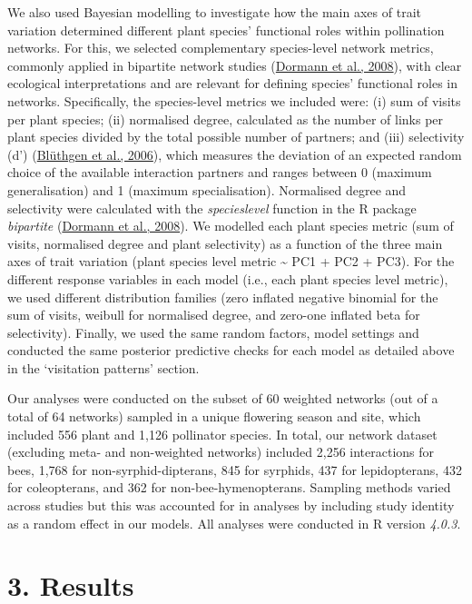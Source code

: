 \documentclass[
  12pt,
  a4paper,
]{article}
\begin{document}
We also used Bayesian modelling to investigate how the main axes of trait variation determined different plant species' functional roles within pollination networks. For this, we selected complementary species-level network metrics, commonly applied in bipartite network studies (\protect\hyperlink{ref-dormann2008}{Dormann et al., 2008}), with clear ecological interpretations and are relevant for defining species' functional roles in networks. Specifically, the species-level metrics we included were: (i) sum of visits per plant species; (ii) normalised degree, calculated as the number of links per plant species divided by the total possible number of partners; and (iii) selectivity (d') (\protect\hyperlink{ref-bluthgen2006}{Blüthgen et al., 2006}), which measures the deviation of an expected random choice of the available interaction partners and ranges between 0 (maximum generalisation) and 1 (maximum specialisation). Normalised degree and selectivity were calculated with the \emph{specieslevel} function in the R package \emph{bipartite} (\protect\hyperlink{ref-dormann2008}{Dormann et al., 2008}). We modelled each plant species metric (sum of visits, normalised degree and plant selectivity) as a function of the three main axes of trait variation (plant species level metric \textasciitilde{} PC1 + PC2 + PC3). For the different response variables in each model (i.e., each plant species level metric), we used different distribution families (zero inflated negative binomial for the sum of visits, weibull for normalised degree, and zero-one inflated beta for selectivity). Finally, we used the same random factors, model settings and conducted the same posterior predictive checks for each model as detailed above in the `visitation patterns' section.

Our analyses were conducted on the subset of 60 weighted networks (out of a total of 64 networks) sampled in a unique flowering season and site, which included 556 plant and 1,126 pollinator species. In total, our network dataset (excluding meta- and non-weighted networks) included 2,256 interactions for bees, 1,768 for non-syrphid-dipterans, 845 for syrphids, 437 for lepidopterans, 432 for coleopterans, and 362 for non-bee-hymenopterans. Sampling methods varied across studies but this was accounted for in analyses by including study identity as a random effect in our models. All analyses were conducted in R version \emph{4.0.3}.

\hypertarget{results}{%
\section{3. Results}\label{results}}
\end{document}
